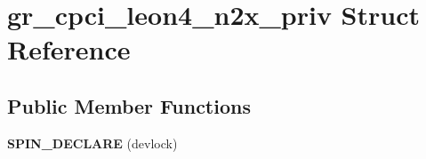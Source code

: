 \hypertarget{structgr__cpci__leon4__n2x__priv}{}\section{gr\+\_\+cpci\+\_\+leon4\+\_\+n2x\+\_\+priv Struct Reference}
\label{structgr__cpci__leon4__n2x__priv}
\subsection*{Public Member Functions}
\begin{DoxyCompactItemize}
\item 
\mbox{\label{structgr__cpci__leon4__n2x__priv_a5b29d55a63c6e2ddc1f59f27266c3764}} 
{\bfseries S\+P\+I\+N\+\_\+\+D\+E\+C\+L\+A\+RE} (devlock)
\end{DoxyCompactItemize}
